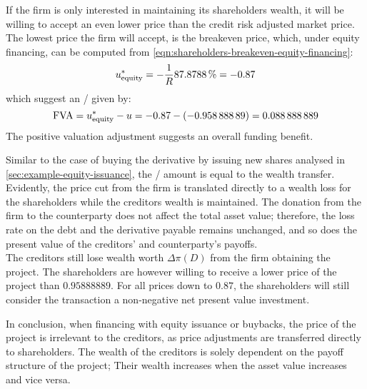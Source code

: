 \documentclass[main.tex]{subfiles}
\begin{document}
            If the firm is only interested in maintaining its shareholders wealth,
            it will be willing to accept an even lower price than the credit risk adjusted market price.
            The lowest price the firm will accept, is the breakeven price,
            which, under equity financing, can be computed from 
            \cref{eqn:shareholders-breakeven-equity-financing}:
            \begin{equation}
                u_{\text{equity}}^{\ast} =
                - \discountfactor
                \pct{0.878788}
                = \num{-0.87}
            \end{equation}
            which suggest an \FVA/ given by:
            \begin{equation}
                \FVA/ =
                u_{\text{equity}}^{\ast} - u =
                \num{-0.87} - \left(\num{-0.95888889}\right) =
                \num{0.088888889}
            \end{equation}
            The positive valuation adjustment suggests an overall funding benefit.
            
            Similar to the case of buying the derivative by issuing new shares analysed in \cref{sec:example-equity-issuance},
            the \FVA/ amount is equal to the wealth transfer.
            Evidently, the price cut from the firm is translated directly to a wealth loss
            for the shareholders while the creditors wealth is maintained. 
            The donation from the firm to the counterparty does not affect the total asset value;
            therefore, the loss rate on the debt and the derivative payable remains unchanged,
            and so does the present value of the creditors' and counterparty's payoffs.
            \\
            The creditors still lose wealth worth $\Delta \pi(D)$ from the firm obtaining the project.
            The shareholders are however willing to receive a lower price of the project than $\num{0.95888889}$.
            For all prices down to $\num{0.87}$,
            the shareholders will still consider the transaction a non-negative net present value investment.

            In conclusion, when financing with equity issuance or buybacks,
            the price of the project is irrelevant to the creditors,
            as price adjustments are transferred directly to shareholders.
            The wealth of the creditors is solely dependent on the payoff structure of the project;
            Their wealth increases when the asset value increases and vice versa.
\end{document}
